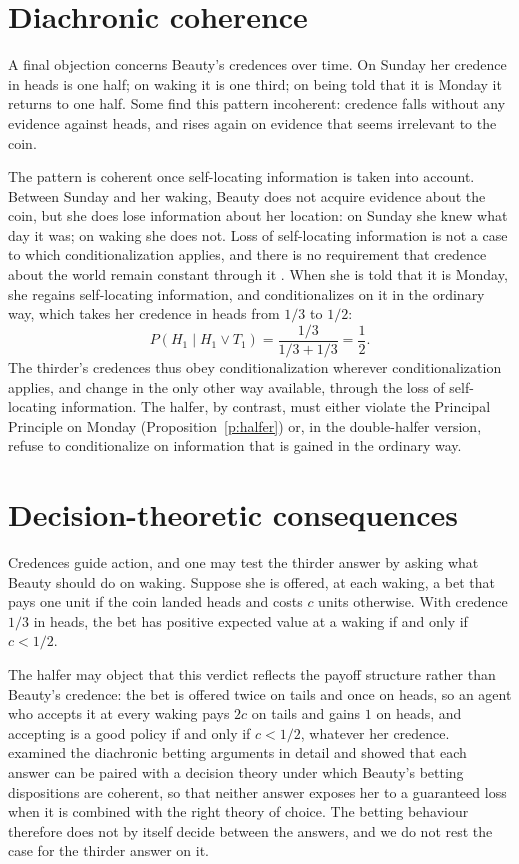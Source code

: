 \documentclass{situationist-preprint}
\begin{document}
\section{Diachronic coherence}

A final objection concerns Beauty's credences over time. On Sunday her credence in heads is one half; on waking it is one third; on being told that it is Monday it returns to one half. Some find this pattern incoherent: credence falls without any evidence against heads, and rises again on evidence that seems irrelevant to the coin.

The pattern is coherent once self-locating information is taken into account. Between Sunday and her waking, Beauty does not acquire evidence about the coin, but she does lose information about her location: on Sunday she knew what day it was; on waking she does not. Loss of self-locating information is not a case to which conditionalization applies, and there is no requirement that credence about the world remain constant through it \citep{Arntzenius2003}. When she is told that it is Monday, she regains self-locating information, and conditionalizes on it in the ordinary way, which takes her credence in heads from $1/3$ to $1/2$:
\[
P(H_1 \mid H_1 \vee T_1) = \frac{1/3}{1/3 + 1/3} = \frac{1}{2}.
\]
The thirder's credences thus obey conditionalization wherever conditionalization applies, and change in the only other way available, through the loss of self-locating information. The halfer, by contrast, must either violate the Principal Principle on Monday (Proposition~\ref{p:halfer}) or, in the double-halfer version, refuse to conditionalize on information that is gained in the ordinary way.

\section{Decision-theoretic consequences}

Credences guide action, and one may test the thirder answer by asking what Beauty should do on waking. Suppose she is offered, at each waking, a bet that pays one unit if the coin landed heads and costs $c$ units otherwise. With credence $1/3$ in heads, the bet has positive expected value at a waking if and only if $c < 1/2$.

The halfer may object that this verdict reflects the payoff structure rather than Beauty's credence: the bet is offered twice on tails and once on heads, so an agent who accepts it at every waking pays $2c$ on tails and gains $1$ on heads, and accepting is a good policy if and only if $c < 1/2$, whatever her credence. \citet{Briggs2010} examined the diachronic betting arguments in detail and showed that each answer can be paired with a decision theory under which Beauty's betting dispositions are coherent, so that neither answer exposes her to a guaranteed loss when it is combined with the right theory of choice. The betting behaviour therefore does not by itself decide between the answers, and we do not rest the case for the thirder answer on it.
\end{document}
